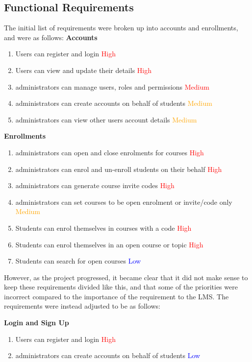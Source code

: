 \subsection{Functional Requirements}

The initial list of requirements were broken up into accounts and enrollments, and were as follows:
\textbf{Accounts}
    \begin{enumerate}
    \item Users can register and login \textcolor{Red}{High}
    \item Users can view and update their details \textcolor{Red}{High}
    \item administrators can manage users, roles and permissions \textcolor{Red}{Medium}
    \item administrators can create accounts on behalf of students \textcolor{Orange}{Medium}
    \item administrators can view other users account details \textcolor{Orange}{Medium}
    \end{enumerate}

\textbf{Enrollments}
    \begin{enumerate}
    \item administrators can open and close enrolments for courses \textcolor{Red}{High}
    \item administrators can enrol and un-enroll students on their behalf \textcolor{Red}{High}
    \item administrators can generate course invite codes \textcolor{Red}{High}
    \item administrators can set courses to be open enrolment or invite/code only \textcolor{Orange}{Medium}
    \item Students can enrol themselves in courses with a code \textcolor{Red}{High}
    \item Students can enrol themselves in an open course or topic \textcolor{Red}{High}
    \item Students can search for open courses \textcolor{Blue}{Low}
    \end{enumerate}

However, as the project progressed, it became clear that it did not make sense to keep these requirements divided like this, and that some of the priorities were incorrect compared to the importance of the requirement to the LMS. The requirements were instead adjusted to be as follows:

\textbf{Login and Sign Up}
\begin{enumerate}
    \item Users can register and login \textcolor{Red}{High}
    \item administrators can create accounts on behalf of students \textcolor{Blue}{Low}
\end{enumerate}

